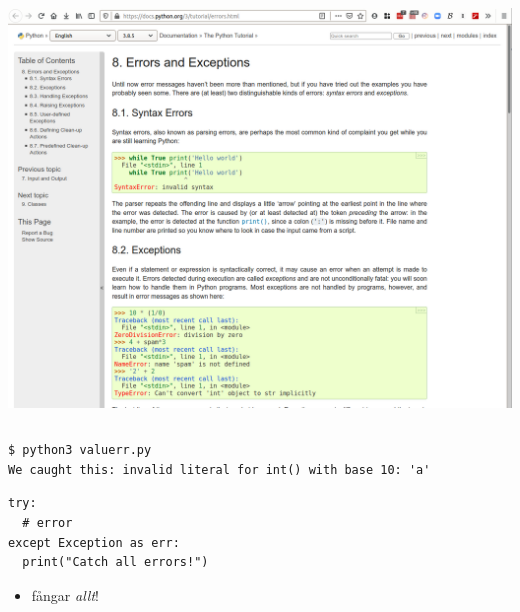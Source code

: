 \begin{frame}
  \includegraphics[width=\columnwidth]{figs/docs-except.png}
\end{frame}

\begin{frame}[fragile]
  \begin{example}
    \inputminted{python}{examples/valuerr.py}
  \end{example}

  \pause

  \begin{example}
    \begin{verbatim}
$ python3 valuerr.py
We caught this: invalid literal for int() with base 10: 'a'
    \end{verbatim}
  \end{example}
\end{frame}

\begin{frame}[fragile]
  \begin{verbatim}
try:
  # error
except Exception as err:
  print("Catch all errors!")
  \end{verbatim}
  \begin{remark}
    \begin{itemize}
      \item {} fångar \emph{allt}!
    \end{itemize}
  \end{remark}
\end{frame}

\begin{frame}[fragile]
  \begin{example}[manyerr.py]
    \inputminted{python}{examples/manyerr.py}
  \end{example}
\end{frame}

